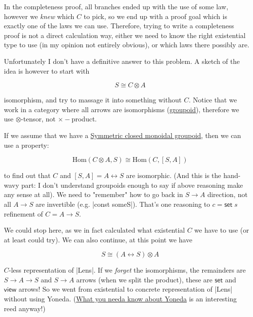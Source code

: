 \documentclass{article}
\begin{document}
In the completeness proof, all branches ended up with the use of some law,
however we \emph{knew} which $C$ to pick, so we end up with a proof goal which
is exactly one of the laws we can use.
Therefore, trying to write a completeness proof is not a direct calculation
way, either we need to know the right existential type to use (in my opinion
not entirely obvious), or which laws there possibly are.

Unfortunately I don't have a definitive answer to this problem.
A sketch of the idea is however to start with

\begin{equation}
\quad S \cong C \otimes A
\end{equation}

isomorphism, and try to massage it into something without $C$.
Notice that we work in a category where all arrows are isomorphisms (\href{https://en.wikipedia.org/wiki/Groupoid}{groupoid}),
therefore we use $\otimes$-tensor, not $\times-$product.

If we assume that we have a
\href{https://ncatlab.org/nlab/show/closed+monoidal+category#symmetric_closed_monoidal_category}{Symmetric closed monoidal groupoid},
then we can use a property:

\begin{equation}
\quad    \mathrm{Hom}(C\otimes A, S) \cong \mathrm{Hom}(C,[ S, A] )
\end{equation}

to find out that $C$ and $[S,A] = A \leftrightarrow S$ are isomorphic.
(And this is the hand-wavy part: I don't understand groupoids enough to say if above reasoning make any sense at all).
We need to "remember" how to go back in $S \to A$ direction, not all $A \to S$ are invertible (e.g. |const someS|).
That's one reasoning to $c = \mathsf{set}\; s$ refinement of $C = A \to S$.

We could stop here, as we in fact calculated what existential $C$ we have to use
(or at least could try).
We can also continue, at this point we have

\begin{equation}
\quad S \cong (A \leftrightarrow S) \otimes A
\end{equation}

$C$-less representation of |Lens|. If we \emph{forget} the isomorphisms,
the remainders are $S \to A \to S$ and $S \to A$ arrows (when we split the product),
these are $\mathsf{set}$ and $\mathsf{view}$ arrows!
So we went from existential to concrete representation of |Lens| without
using Yoneda.
(\href{https://dl.acm.org/citation.cfm?id=3236779}{What you needa know about Yoneda} is an interesting reed anyway!)
\end{document}

